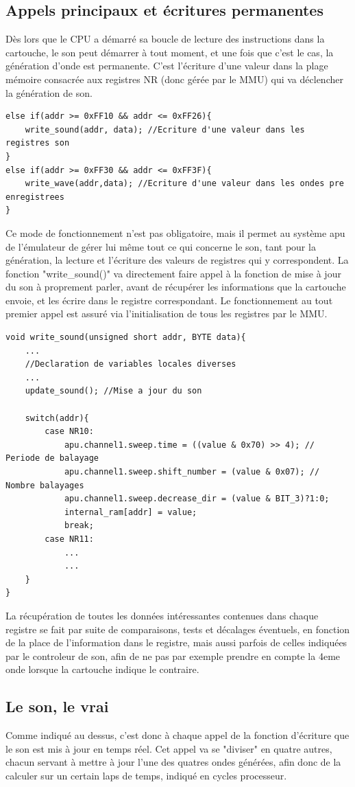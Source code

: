 \documentclass{report}
\begin{document}
\subsection{Appels principaux et écritures permanentes}
Dès lors que le CPU a démarré sa boucle de lecture des instructions dans la cartouche, le son peut démarrer à tout moment, et une fois que c'est le cas, la génération d'onde est permanente.
C'est l'écriture d'une valeur dans la plage mémoire consacrée aux registres NR (donc gérée par le MMU) qui va déclencher la génération de son.
\begin{lstlisting}
else if(addr >= 0xFF10 && addr <= 0xFF26){
	write_sound(addr, data); //Ecriture d'une valeur dans les registres son
}
else if(addr >= 0xFF30 && addr <= 0xFF3F){
	write_wave(addr,data); //Ecriture d'une valeur dans les ondes pre enregistrees
}
\end{lstlisting}
Ce mode de fonctionnement n'est pas obligatoire, mais il permet au système apu de l'émulateur de gérer lui même tout ce qui concerne le son, tant pour la génération, la lecture et l'écriture des valeurs de registres qui y correspondent.
La fonction "write\_sound()" va directement faire appel à la fonction de mise à jour du son à proprement parler, avant de récupérer les informations que la cartouche envoie, et les écrire dans le registre correspondant. Le fonctionnement au tout premier appel est assuré via l'initialisation de tous les registres par le MMU.
\begin{lstlisting}
void write_sound(unsigned short addr, BYTE data){
	...
	//Declaration de variables locales diverses
	...
	update_sound(); //Mise a jour du son

	switch(addr){
		case NR10:
			apu.channel1.sweep.time = ((value & 0x70) >> 4); // Periode de balayage
			apu.channel1.sweep.shift_number = (value & 0x07); // Nombre balayages
			apu.channel1.sweep.decrease_dir = (value & BIT_3)?1:0;
			internal_ram[addr] = value;
			break;
		case NR11:
			...
			...
	}
}
\end{lstlisting}
La récupération de toutes les données intéressantes contenues dans chaque registre se fait par suite de comparaisons, tests et décalages éventuels, en fonction de la place de l'information dans le registre, mais aussi 
parfois de celles indiquées par le controleur de son, afin de ne pas par exemple prendre en compte la 4eme onde lorsque la cartouche indique le contraire.
\subsection{Le son, le vrai}
Comme indiqué au dessus, c'est donc à chaque appel de la fonction d'écriture que le son est mis à jour en temps réel.
Cet appel va se "diviser" en quatre autres, chacun servant à mettre à jour l'une des quatres ondes générées, afin donc de la calculer sur un certain laps de temps, indiqué en cycles processeur.
\end{document}
